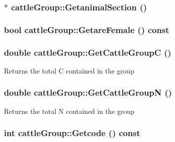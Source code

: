 \label{classcattle_group_a86e0db44ae65503c4288b8f0f00caa0d}
\hypertarget{classcattle_group_a1822e1d26e286df36a7f307e379cc684}{
\subsubsection[{GetanimalSection}]{$\ast$ cattleGroup::GetanimalSection ()}}
\label{classcattle_group_a1822e1d26e286df36a7f307e379cc684}
\hypertarget{classcattle_group_ac312442c56d183c4fff3c6b3a520a54f}{
\subsubsection[{GetareFemale}]{\setlength{\rightskip}{0pt plus 5cm}bool cattleGroup::GetareFemale () const}}
\label{classcattle_group_ac312442c56d183c4fff3c6b3a520a54f}
\hypertarget{classcattle_group_ae47b260227ef5e23c24491c3958121d1}{
\subsubsection[{GetCattleGroupC}]{\setlength{\rightskip}{0pt plus 5cm}double cattleGroup::GetCattleGroupC ()}}
\label{classcattle_group_ae47b260227ef5e23c24491c3958121d1}
Returns the total C contained in the group \hypertarget{classcattle_group_a3c3c4ab462568c477f17a3842f828559}{
\subsubsection[{GetCattleGroupN}]{\setlength{\rightskip}{0pt plus 5cm}double cattleGroup::GetCattleGroupN ()}}
\label{classcattle_group_a3c3c4ab462568c477f17a3842f828559}
Returns the total N contained in the group \hypertarget{classcattle_group_a28dcd27ede1d2e379ac9393fbfe6bf3a}{
\subsubsection[{Getcode}]{\setlength{\rightskip}{0pt plus 5cm}int cattleGroup::Getcode () const}}
